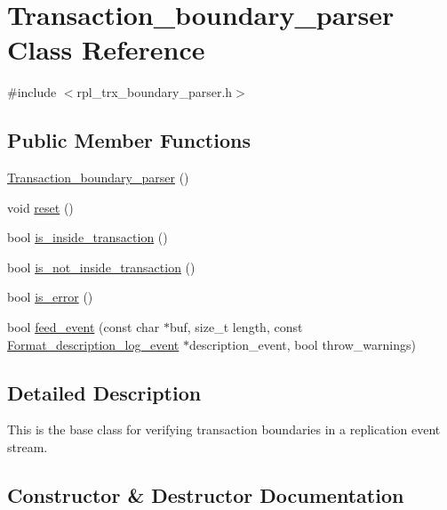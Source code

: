 \hypertarget{classTransaction__boundary__parser}{}\section{Transaction\+\_\+boundary\+\_\+parser Class Reference}
\label{classTransaction__boundary__parser}


{\ttfamily \#include $<$rpl\+\_\+trx\+\_\+boundary\+\_\+parser.\+h$>$}

\subsection*{Public Member Functions}
\begin{DoxyCompactItemize}
\item 
\mbox{\hyperlink{classTransaction__boundary__parser_a873818b9bae2fce7286024e218b5117b}{Transaction\+\_\+boundary\+\_\+parser}} ()
\item 
void \mbox{\hyperlink{classTransaction__boundary__parser_aeaef08e74aca6c66acaacd3d8c7d9faa}{reset}} ()
\item 
bool \mbox{\hyperlink{classTransaction__boundary__parser_aa801e6b1fa7d54ebd3c586854945c7b7}{is\+\_\+inside\+\_\+transaction}} ()
\item 
bool \mbox{\hyperlink{classTransaction__boundary__parser_a59249ee780e4ba4af0d3d3fb69b6a2d2}{is\+\_\+not\+\_\+inside\+\_\+transaction}} ()
\item 
bool \mbox{\hyperlink{classTransaction__boundary__parser_a2d48eeaf3ec9467405a617d834dfdab4}{is\+\_\+error}} ()
\item 
bool \mbox{\hyperlink{classTransaction__boundary__parser_a1197dba976b325a64bbcde19cc235b40}{feed\+\_\+event}} (const char $\ast$buf, size\+\_\+t length, const \mbox{\hyperlink{classFormat__description__log__event}{Format\+\_\+description\+\_\+log\+\_\+event}} $\ast$description\+\_\+event, bool throw\+\_\+warnings)
\end{DoxyCompactItemize}


\subsection{Detailed Description}
This is the base class for verifying transaction boundaries in a replication event stream. 

\subsection{Constructor \& Destructor Documentation}
\mbox{\label{classTransaction__boundary__parser_a873818b9bae2fce7286024e218b5117b}} 
